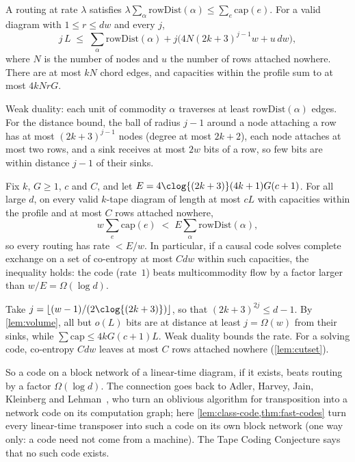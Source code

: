\begin{lemma}\label{lem:volume}
A routing at rate $\lambda$ satisfies $\lambda\sum_\alpha\mathrm{rowDist}(\alpha)\le\sum_e\mathrm{cap}(e)$. For a
valid diagram with $1\le r\le dw$ and every $j$,
\[
  j\,L\;\le\;\sum_\alpha\mathrm{rowDist}(\alpha)+j\bigl(4N(2k+3)^{j-1}w+u\,dw\bigr),
\]
where $N$ is the number of nodes and $u$ the number of rows attached nowhere. There are at most $kN$
chord edges, and capacities within the profile sum to at most $4kNrG$.
\end{lemma}

\begin{outline}
Weak duality: each unit of commodity $\alpha$ traverses at least $\mathrm{rowDist}(\alpha)$ edges. For the
distance bound, the ball of radius $j-1$ around a node attaching a row has at most $(2k+3)^{j-1}$ nodes
(degree at most $2k+2$), each node attaches at most two rows, and a sink receives at most $2w$ bits of a
row, so few bits are within distance $j-1$ of their sinks.
\end{outline}

\begin{theorem}\label{thm:code-gap}
Fix $k$, $G\ge1$, $c$ and $C$, and let $E=4\clog{(2k+3)}(4k+1)G(c+1)$. For all large $d$, on every valid
$k$-tape diagram of length at most $cL$ with capacities within the profile and at most $C$ rows
attached nowhere,
\[
  w\sum_e\mathrm{cap}(e)\;<\;E\sum_\alpha\mathrm{rowDist}(\alpha),
\]
so every routing has rate $<E/w$. In particular, if a causal code solves complete exchange on a set of
co-entropy at most $Cdw$ within such capacities, the inequality holds: the code (rate~$1$) beats
multicommodity flow by a factor larger than $w/E=\Omega(\log d)$.
\end{theorem}

\begin{outline}
Take $j=\lfloor(w-1)/(2\clog{(2k+3)})\rfloor$, so that $(2k+3)^{2j}\le d-1$. By \cref{lem:volume}, all
but $o(L)$ bits are at distance at least $j=\Omega(w)$ from their sinks, while
$\sum\mathrm{cap}\le4kG(c+1)L$. Weak duality bounds the rate. For a solving code, co-entropy $Cdw$
leaves at most $C$ rows attached nowhere (\cref{lem:cutset}).
\end{outline}

So a code on a block network of a linear-time diagram, if it exists, beats routing by a factor
$\Omega(\log d)$. The connection goes back to Adler, Harvey, Jain, Kleinberg and
Lehman~\cite[Thm.~6.2]{AHJKL2006}, who turn an oblivious algorithm for transposition into a network code on
its computation graph; here \cref{lem:class-code,thm:fast-codes} turn every linear-time transposer into such a
code on its own block network (one way only: a code need not come from a machine). The Tape Coding
Conjecture says that no such code exists.

